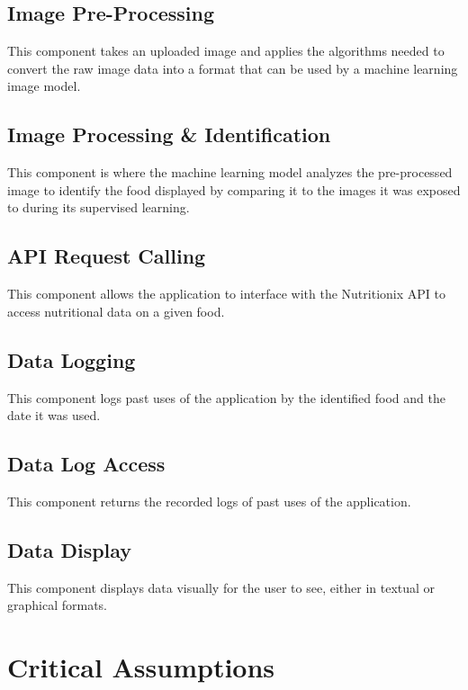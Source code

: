 \documentclass{article}
\begin{document}
\subsection{Image Pre-Processing}
This component takes an uploaded image and applies the algorithms needed to convert the raw image data into a format that can be used by a machine learning image model.

\subsection{Image Processing \& Identification}
This component is where the machine learning model analyzes the pre-processed image to identify the food displayed by comparing it to the images it was exposed to during its supervised learning. 

\subsection{API Request Calling}
This component allows the application to interface with the Nutritionix API to access nutritional data on a given food.  

\subsection{Data Logging}
This component logs past uses of the application by the identified food and the date it was used.   

\subsection{Data Log Access}
This component returns the recorded logs of past uses of the application.

\subsection{Data Display}
This component displays data visually for the user to see, either in textual or graphical formats.

\section{Critical Assumptions}

\end{document}
